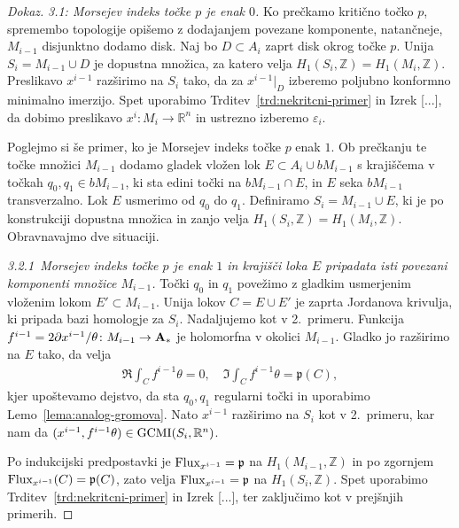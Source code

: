 \documentclass[12pt,a4paper,twoside]{article}
\theoremstyle{definition} %
\newenvironment{dokaz}[1][Dokaz]{\begin{proof}[#1]}{\end{proof}}
\theoremstyle{plain} %
\numberwithin{equation}{section}  %
\newcommand{\Z}{\mathbb Z}
\begin{document}
\begin{dokaz}
\textit{3.1: Morsejev indeks točke $p$ je enak $0$.} \newline
Ko prečkamo kritično točko $p$, spremembo topologije opišemo z dodajanjem povezane komponente, natančneje, $M_{i-1}$ disjunktno dodamo disk.
Naj bo $D \subset A_{i}$ zaprt disk okrog točke $p$. Unija $S_{i} = M_{i-1} \cup D$ je dopustna množica, za katero velja $H_{1}(S_{i}, \mathbb{Z}) = H_{1}(M_{i}, \mathbb{Z})$.
Preslikavo $x^{i-1}$ razširimo na $S_{i}$ tako, da za $x^{i-1}|_{D}$ izberemo poljubno konformno minimalno imerzijo.
Spet uporabimo Trditev~\ref{trd:nekritcni-primer} in Izrek [...], %
da dobimo preslikavo $x^{i} \colon M_{i} \to \mathbb{R}^{n}$ in ustrezno izberemo $\varepsilon_{i}$. \newline

Poglejmo si še primer, ko je Morsejev indeks točke $p$ enak $1$. Ob prečkanju te točke množici $M_{i-1}$ dodamo gladek vložen lok $E \subset A_{i} \cup bM_{i-1}$ s krajiščema v točkah $q_0, q_1 \in bM_{i-1}$, ki sta edini točki na $bM_{i-1} \cap E$, in $E$ seka $bM_{i-1}$ transverzalno. Lok $E$ usmerimo od $q_0$ do $q_1$.
Definiramo $S_{i} = M_{i-1} \cup E$, ki je po konstrukciji dopustna množica in zanjo velja $H_{1}(S_{i}, \mathbb{Z}) = H_{1}(M_{i}, \mathbb{Z})$. Obravnavajmo dve situaciji. \newline

\textit{3.2.1~Morsejev indeks točke $p$ je enak $1$ in krajišči loka $E$ pripadata isti povezani komponenti množice $M_{i-1}$.} \newline
Točki $q_0$ in $q_1$ povežimo z gladkim usmerjenim vloženim lokom $E' \subset M_{i-1}$. 
Unija lokov $C = E \cup E'$ je zaprta Jordanova krivulja, ki pripada bazi homologje za $S_{i}$.
Nadaljujemo kot v 2.~primeru. Funkcija $f^{i-1} = 2 \partial x^{i-1} / \theta \colon M_{i-1} \to \textup{\textbf{A}}_{*}$ je holomorfna v okolici $M_{i-1}$.
Gladko jo razširimo na $E$ tako, da velja
\begin{gather*}
\Re \int_{C} f^{i-1} \theta = 0, \quad \Im \int_{C} f^{i-1} \theta = \mathfrak{p}(C),
\end{gather*}
kjer upoštevamo dejstvo, da sta $q_0, q_1$ regularni točki in uporabimo Lemo~\ref{lema:analog-gromova}.
Nato $x^{i-1}$ razširimo na $S_{i}$ kot v 2.~primeru, kar nam da $(x^{i-1}, f^{i-1} \theta) \in \textup{GCMI}(S_{i}, \mathbb{R}^{n})$.

Po indukcijski predpostavki je $\textup{Flux}_{x^{i-1}} = \mathfrak{p}$ na $H_{1}(M_{i-1},\Z)$ in po zgornjem $\textup{Flux}_{x^{i-1}}(C) = \mathfrak{p}(C)$, zato velja
$\textup{Flux}_{x^{i-1}} = \mathfrak{p}$ na $H_{1}(S_{i},\Z)$.
Spet uporabimo Trditev~\ref{trd:nekritcni-primer} in Izrek [...], %
ter zaključimo kot v prejšnjih primerih. \newline


\end{dokaz}
\end{document}
